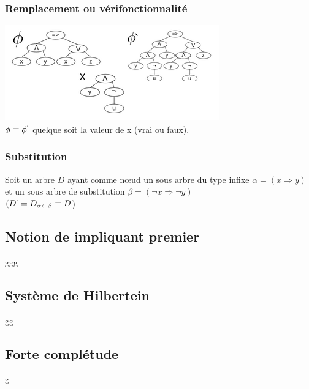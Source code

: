 \subsubsection{Remplacement ou vérifonctionnalité}
\includegraphics[scale=0.8]{img/of-remplacement.png} \\

$\phi \equiv \phi^{`}$ quelque soit la valeur de x (vrai ou faux).

\subsubsection{Substitution}
Soit un arbre $D$ ayant comme nœud un sous arbre du type infixe $\alpha = (x \Rightarrow y)$ et un sous arbre de substitution $\beta = (\neg x \Rightarrow \neg y)$\\
$(D^{`} = D_{\alpha \leftarrow \beta} \equiv D$)\\

\subsection{Notion de impliquant premier }

ggg

\subsection{Système de Hilbertein}

gg

\subsection{Forte complétude}

g

\pagebreak
